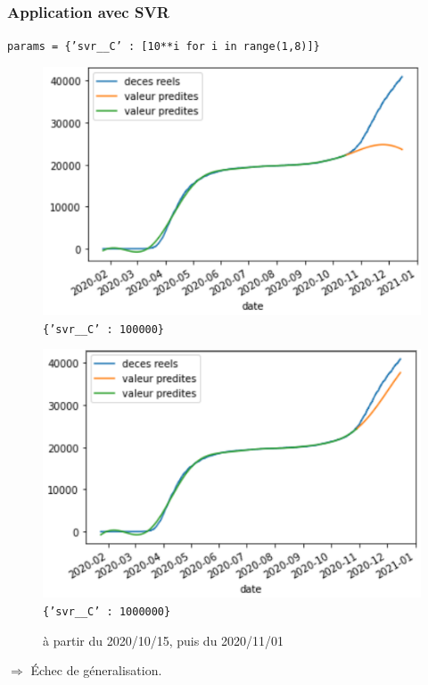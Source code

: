 \documentclass{beamer}[aspectratio = 43]
\begin{document}
\begin{frame}
	\frametitle{Application avec SVR}
		\texttt{params = \{'svr\_\_C' : [10**i for i in range(1,8)]\}}\\
	\begin{figure}[h]
		\centering
		\begin{minipage}{0.5\textwidth}
			\includegraphics[scale=0.42]{SVR_avant_pt_dinflexion_}
			\centering
			\tiny{\texttt{\{'svr\_\_C' : 100000\}}}
		\end{minipage}%
		\begin{minipage}{0.5\textwidth}
			\includegraphics[scale=0.42]{SVR_apres_pt_dinflexion_}
			\centering
			\tiny{\texttt{\{'svr\_\_C' : 1000000\}}}
		\end{minipage}
	\caption{à partir du 2020/10/15, puis du 2020/11/01}
	\end{figure}
	$\Rightarrow$ \'Echec de géneralisation.
\end{frame}
\end{document}
